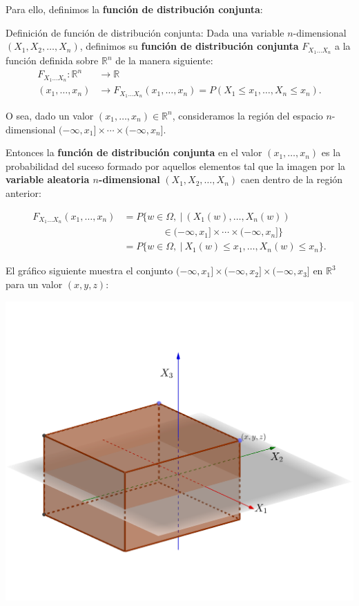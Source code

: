 \documentclass[]{book}
\begin{document}
Para ello, definimos la \textbf{función de distribución conjunta}:

Definición de función de distribución conjunta:
Dada una variable \(n\)-dimensional \((X_1,X_2,\ldots,X_n)\), definimos su \textbf{función de distribución conjunta} \(F_{X_1\ldots X_n}\) a la función definida sobre \(\mathbb{R}^n\) de la manera siguiente:
\[
\begin{array}{rl}
F_{X_1\ldots X_n}: \mathbb{R}^n & \longrightarrow \mathbb{R}\\
(x_1,\ldots,x_n) & \longrightarrow F_{X_1\ldots X_n}(x_1,\ldots,x_n)=P(X_1\leq x_1,\ldots,X_n\leq x_n).
\end{array}
\]

O sea, dado un valor \((x_1,\ldots,x_n)\in \mathbb{R}^n\), consideramos la región del espacio \(n\)-dimensional \((-\infty,x_1]\times\cdots\times (-\infty,x_n]\).

Entonces la \textbf{función de distribución conjunta} en el valor \((x_1,\ldots,x_n)\) es la probabilidad del suceso formado por aquellos elementos tal que la imagen por la \textbf{variable aleatoria \(n\)-dimensional} \((X_1,X_2,\ldots,X_n)\) caen dentro de la región anterior:

\[
\begin{array}{rl}
F_{X_1\ldots X_n}(x_1,\ldots,x_n) & =P\{w\in\Omega,\ |\ (X_1(w),\ldots,X_n(w)) \\ & \qquad\qquad\in (-\infty,x_1]\times\cdots\times (-\infty,x_n]\} \\ & = P\{w\in\Omega,\ |\ X_1(w)\leq x_1,\ldots, X_n(w)\leq x_n\}.
\end{array}
\]

El gráfico siguiente muestra el conjunto \((-\infty,x_1]\times (-\infty,x_2]\times (-\infty,x_3]\) en \(\mathbb{R}^3\) para un valor \((x,y,z)\):

\includegraphics{Images/Fx1x2x3.png}
\end{document}
